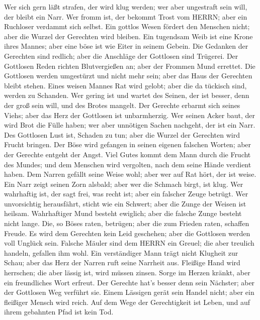  Wer sich gern läßt strafen, der wird klug werden; wer aber
ungestraft sein will, der bleibt ein Narr.  Wer fromm ist,
der bekommt Trost vom HERRN; aber ein Ruchloser verdammt sich selbst.
 Ein gottlos Wesen fördert den Menschen nicht; aber die
Wurzel der Gerechten wird bleiben.  Ein tugendsam Weib ist
eine Krone ihres Mannes; aber eine böse ist wie Eiter in seinem Gebein.
 Die Gedanken der Gerechten sind redlich; aber die Anschläge
der Gottlosen sind Trügerei.  Der Gottlosen Reden richten
Blutvergießen an; aber der Frommen Mund errettet.  Die
Gottlosen werden umgestürzt und nicht mehr sein; aber das Haus der
Gerechten bleibt stehen.  Eines weisen Mannes Rat wird
gelobt; aber die da tückisch sind, werden zu Schanden.  Wer
gering ist und wartet des Seinen, der ist besser, denn der groß sein
will, und des Brotes mangelt.  Der Gerechte erbarmt sich
seines Viehs; aber das Herz der Gottlosen ist unbarmherzig.
 Wer seinen Acker baut, der wird Brot die Fülle haben; wer
aber unnötigen Sachen nachgeht, der ist ein Narr.  Des
Gottlosen Lust ist, Schaden zu tun; aber die Wurzel der Gerechten wird
Frucht bringen.  Der Böse wird gefangen in seinen eigenen
falschen Worten; aber der Gerechte entgeht der Angst.  Viel
Gutes kommt dem Mann durch die Frucht des Mundes; und dem Menschen wird
vergolten, nach dem seine Hände verdient haben.  Dem Narren
gefällt seine Weise wohl; aber wer auf Rat hört, der ist weise.
 Ein Narr zeigt seinen Zorn alsbald; aber wer die Schmach
birgt, ist klug.  Wer wahrhaftig ist, der sagt frei, was
recht ist; aber ein falscher Zeuge betrügt.  Wer
unvorsichtig herausfährt, sticht wie ein Schwert; aber die Zunge der
Weisen ist heilsam.  Wahrhaftiger Mund besteht ewiglich;
aber die falsche Zunge besteht nicht lange.  Die, so Böses
raten, betrügen; aber die zum Frieden raten, schaffen Freude.
 Es wird dem Gerechten kein Leid geschehen; aber die
Gottlosen werden voll Unglück sein.  Falsche Mäuler sind
dem HERRN ein Greuel; die aber treulich handeln, gefallen ihm wohl.
 Ein verständiger Mann trägt nicht Klugheit zur Schau; aber
das Herz der Narren ruft seine Narrheit aus.  Fleißige Hand
wird herrschen; die aber lässig ist, wird müssen zinsen. 
Sorge im Herzen kränkt, aber ein freundliches Wort erfreut.
 Der Gerechte hat's besser denn sein Nächster; aber der
Gottlosen Weg verführt sie.  Einem Lässigen gerät sein
Handel nicht; aber ein fleißiger Mensch wird reich.  Auf
dem Wege der Gerechtigkeit ist Leben, und auf ihrem gebahnten Pfad ist
kein Tod.

